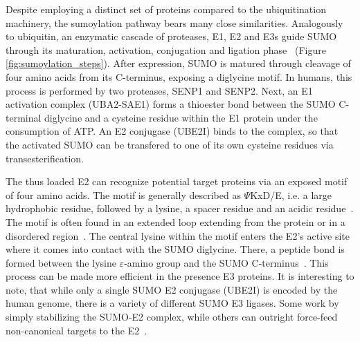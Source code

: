 Despite employing a distinct set of proteins compared to the ubiquitination machinery, the sumoylation pathway bears many close similarities. Analogously to ubiquitin, an enzymatic cascade of proteases, E1, E2 and E3s guide SUMO through its maturation, activation, conjugation and ligation phase~ (Figure \ref{fig:sumoylation_steps}). After expression, SUMO is matured through cleavage of four amino acids from its C-terminus, exposing a diglycine motif. In humans, this process is performed by two proteases, SENP1 and SENP2. Next, an E1 activation complex (UBA2-SAE1) forms a thioester bond between the SUMO C-terminal diglycine and a cysteine residue within the E1 protein under the consumption of ATP. An E2 conjugase (UBE2I) binds to the complex, so that the activated SUMO can be transfered to one of its own cysteine residues via transesterification. 

The thus loaded E2 can recognize potential target proteins via an exposed motif of four amino acids. The motif is generally described as $\Psi$KxD/E, i.e. a large hydrophobic residue, followed by a lysine, a spacer residue and an acidic residue~\cite{sampson_small_2001}. The motif is often found in an extended loop extending from the protein or in a disordered region~. The central lysine within the motif enters the E2's active site where it comes into contact with the SUMO diglycine. There, a peptide bond is formed between the lysine $\varepsilon$-amino group and the SUMO C-terminus~\cite{bernier-villamor_structural_2002}. This process can be made more efficient in the presence E3 proteins. It is interesting to note, that while only a single SUMO E2 conjugase (UBE2I) is encoded by the human genome, there is a variety of different SUMO E3 ligases. Some work by simply stabilizing the SUMO-E2 complex, while others can outright force-feed non-canonical targets to the E2~\cite{streich_jr_capturing_2016}. 

